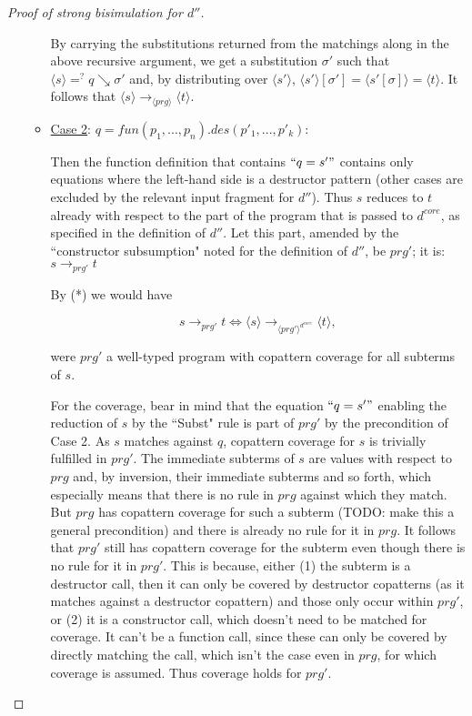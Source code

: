 \documentclass[11pt]{article} %
\begin{document}
\begin{proof}[Proof of strong bisimulation for $d''$]
\begin{enumerate}
\begin{itemize}
By carrying the substitutions returned from the matchings along in the above recursive argument, we get a substitution $\sigma'$ such that $\langle s \rangle =^? q \searrow \sigma'$ and, by distributing over $\langle s' \rangle$, $\langle s' \rangle [\sigma'] = \langle s'[\sigma] \rangle = \langle t \rangle$. It follows that $\langle s \rangle \longrightarrow_{\langle prg \rangle} \langle t \rangle$.

\item \underline{Case 2}: $q = fun(p_1, ..., p_n).des(p'_1, ..., p'_k)$:

Then the function definition that contains $`` q = s' "$ contains only equations where the left-hand side is a destructor pattern (other cases are excluded by the relevant input fragment for $d''$). Thus $s$ reduces to $t$ already with respect to the part of the program that is passed to $d^{core}$, as specified in the definition of $d''$. Let this part, amended by the ``constructor subsumption" noted for the definition of $d''$, be $prg'$; it is: $s \longrightarrow_{prg'} t$

By (*) we would have

\begin{equation*}
s \longrightarrow_{prg'} t \iff \langle s \rangle \longrightarrow_{\langle prg' \rangle^{d^{core}}} \langle t \rangle,
\end{equation*}

were $prg'$ a well-typed program with copattern coverage for all subterms of $s$. 

For the coverage, bear in mind that the equation $`` q = s' "$ enabling the reduction of $s$ by the ``Subst" rule is part of $prg'$ by the precondition of Case 2. As $s$ matches against $q$, copattern coverage for $s$ is trivially fulfilled in $prg'$. The immediate subterms of $s$ are values with respect to $prg$ and, by inversion, their immediate subterms and so forth, which especially means that there is no rule in $prg$ against which they match. But $prg$ has copattern coverage for such a subterm (TODO: make this a general precondition) and there is already no rule for it in $prg$. It follows that $prg'$ still has copattern coverage for the subterm even though there is no rule for it in $prg'$. This is because, either (1) the subterm is a destructor call, then it can only be covered by destructor copatterns (as it matches against a destructor copattern) and those only occur within $prg'$, or (2) it is a constructor call, which doesn't need to be matched for coverage. It can't be a function call, since these can only be covered by directly matching the call, which isn't the case even in $prg$, for which coverage is assumed. Thus coverage holds for $prg'$.


\end{itemize}
\end{enumerate}
\end{proof}
\end{document}
